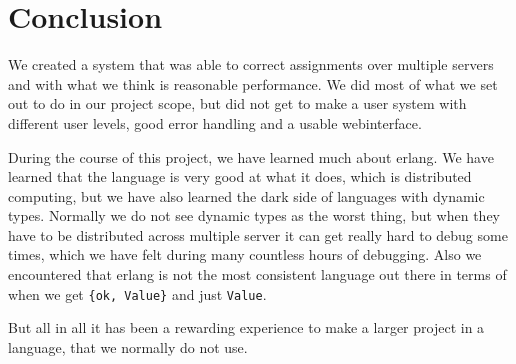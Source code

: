 \chapter{Conclusion}
We created a system that was able to correct assignments over multiple servers
and with what we think is reasonable performance. We did most of what we set out
to do in our project scope, but did not get to make a user system with different
user levels, good error handling and a usable webinterface.

During the course of this project, we have learned much about erlang. We have
learned that the language is very good at what it does, which is distributed
computing, but we have also learned the dark side of languages with dynamic
types. Normally we do not see dynamic types as the worst thing, but when they
have to be distributed across multiple server it can get really hard to debug
some times, which we have felt during many countless hours of debugging.
Also we encountered that erlang is not the most consistent language out there
in terms of when we get \texttt{\{ok, Value\}} and just \texttt{Value}.

But all in all it has been a rewarding experience to make a larger project in a
language, that we normally do not use.
